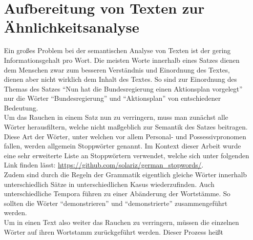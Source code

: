 \section{Aufbereitung von Texten zur Ähnlichkeitsanalyse}
Ein großes Problem bei der semantischen Analyse von Texten ist der gering Informationsgehalt pro Wort. Die meisten Worte innerhalb eines Satzes dienen dem Menschen zwar zum besseren Verständnis und Einordnung des Textes, dienen aber nicht wirklich dem Inhalt des Textes. So sind zur Einordnung des Themas des Satzes "`Nun hat die Bundesregierung einen Aktionsplan vorgelegt"' nur die Wörter "`Bundesregierung"' und "`Aktionsplan"' von entschiedener Bedeutung. \\ \newline
Um das Rauchen in einem Satz nun zu verringern, muss man zunächst alle Wörter herausfiltern, welche nicht maßgeblich zur Semantik des Satzes beitragen. Diese Art der Wörter, unter welchen vor allem Personal- und Possessivpronomen fallen, werden allgemein Stoppwörter genannt. Im Kontext dieser Arbeit wurde eine sehr erweiterte Liste an Stoppwörtern verwendet, welche sich unter folgenden Link finden lässt: \url{https://github.com/solariz/german_stopwords/}. \\ \newline
Zudem sind durch die Regeln der Grammatik eigentlich gleiche Wörter innerhalb unterschiedlich Sätze in unterschiedlichen Kasus wiederzufinden. Auch unterschiedliche Tempora führen zu einer Abänderung der Wortstämme. So sollten die Wörter "`demonstrieren"' und "`demonstrierte"' zusammengeführt werden. \\ \newline
Um in einen Text also weiter das Rauchen zu verringern, müssen die einzelnen Wörter auf ihren Wortstamm zurückgeführt werden. Dieser Prozess heißt 


